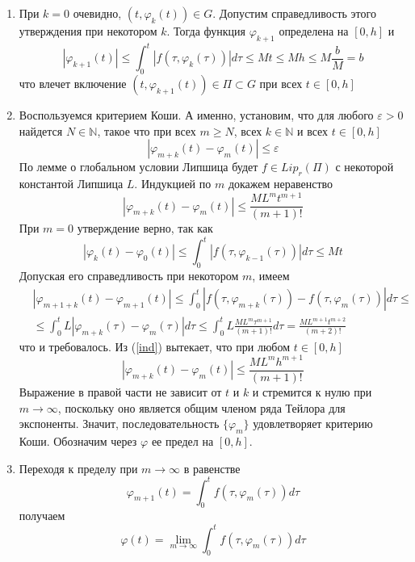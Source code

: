\documentclass{article}
\begin{document}
\begin{enumerate}
    \item При $k = 0$ очевидно, $(t, \varphi_k(t)) \in G$. Допустим справедливость этого утверждения при некотором $k$. Тогда функция $\varphi_{k+1}$ определена на $[0,h]$ и
    \begin{equation*}
        |\varphi_{k+1}(t)| \le \int_0^t |f(\tau, \varphi_k(\tau))|d\tau \le Mt \le Mh \le M\frac{b}{M} = b
    \end{equation*}
    что влечет включение $(t, \varphi_{k+1}(t)) \in \Pi \subset G$ при всех $t \in [0,h]$
    \item Воспользуемся критерием Коши. А именно, установим, что для любого $\varepsilon > 0$ найдется $N \in \mathbb{N}$, такое что при всех $m \ge N$, всех $k \in \mathbb{N}$ и всех $t \in [0,h]$
    \begin{equation*}
        |\varphi_{m+k}(t) - \varphi_m(t)| \le \varepsilon
    \end{equation*}
    По лемме о глобальном условии Липшица будет $f \in Lip_r(\Pi)$ с некоторой константой Липшица $L$. Индукцией по $m$ докажем неравенство
    \begin{equation}
        |\varphi_{m+k}(t) - \varphi_m(t)| \le \frac{ML^mt^{m+1}}{(m+1)!} \label{ind}
    \end{equation}
    При $m = 0$ утверждение верно, так как
    \begin{equation*}
        |\varphi_k(t) - \varphi_0(t)| \le \int_0^t |f(\tau, \varphi_{k-1}(\tau))|d\tau \le Mt
    \end{equation*}
    Допуская его справедливость при некотором $m$, имеем
    \begin{equation*}
        \begin{aligned}
            &|\varphi_{m + 1 + k}(t) - \varphi_{m+1}(t)| \le \int_0^t |f(\tau, \varphi_{m+k}(\tau)) - f(\tau, \varphi_m(\tau))|d\tau \le \\
            &\le \int_0^t L|\varphi_{m+k}(\tau) - \varphi_m(\tau)|d\tau \le \int_0^t L\frac{ML^m\tau^{m+1}}{(m+1)!}d\tau = \frac{ML^{m+1}t^{m+2}}{(m+2)!}
        \end{aligned}
    \end{equation*}
    что и требовалось. Из (\ref{ind}) вытекает, что при любом $t \in [0,h]$
    \begin{equation}
        |\varphi_{m+k}(t) - \varphi_m(t)| \le \frac{ML^mh^{m+1}}{(m+1)!} \label{indh}
    \end{equation}
    Выражение в правой части не зависит от $t$ и $k$ и стремится к нулю при $m \to \infty$, поскольку оно является общим членом ряда Тейлора для экспоненты. Значит, последовательность $\{\varphi_m\}$ удовлетворяет критерию Коши. Обозначим через $\varphi$ ее предел на $[0,h]$.
    \item Переходя к пределу при $m \to \infty$ в равенстве
    \begin{equation*}
        \varphi_{m+1}(t) = \int_0^t f(\tau, \varphi_m(\tau))d\tau
    \end{equation*}
    получаем
    \begin{equation}
        \varphi(t) = \lim_{m \to \infty} \int_0^t f(\tau, \varphi_m(\tau))d\tau \label{lim}
    \end{equation}
    

\end{enumerate}
\end{document}
